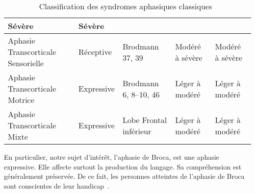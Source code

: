 \begin{table}[ht]
\begin{adjustbox}{max width=15cm}
\begin{tabular}{|p{3cm}|p{3cm}|p{3cm}|p{3cm}|p{3cm}|}
        Sévère                                                  &
        Sévère                                                  \\
        \hline
        Aphasie Transcorticale Sensorielle                      &
        Réceptive                                               &
        Brodmann 37, 39                                         &
        Modéré à sévère                                         &
        Modéré à sévère                                         \\
        \hline
        Aphasie Transcorticale Motrice                          &
        Expressive                                              &
        Brodmann 6, 8--10, 46                                   &
        Léger à modéré                                          &
        Léger à modéré                                          \\
        \hline
        Aphasie Transcorticale Mixte                            &
        Expressive                                              &
        Lobe Frontal inférieur                                  &
        Léger à modéré                                          &
        Léger à modéré                                          \\
        \hline
        \end{tabular}
    \end{adjustbox}
    \caption[{Classification des syndromes aphasiques classiques~\cite{Hallowell_2017}}]%
    {Classification des syndromes aphasiques classiques~\cite{Hallowell_2017}}
    \label{tab.aphasia-classification}
\end{table}
En particulier, notre sujet d'intérêt, l'aphasie de Broca, est une aphasie expressive.
Elle affecte surtout la production du langage.
Sa compréhension est généralement préservée.
De ce fait, les personnes atteintes de l'aphasie de Broca sont conscientes de leur handicap~\cite{Chapey_2008}.

